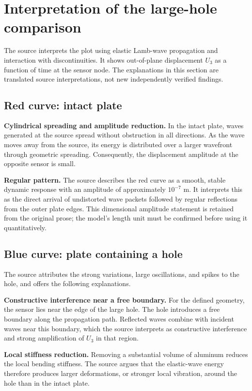 \documentclass[11pt,a4paper]{article}
\begin{document}
\section{Interpretation of the large-hole comparison}
The source interprets the plot using elastic Lamb-wave propagation and interaction with discontinuities. It shows out-of-plane displacement $U_3$ as a function of time at the sensor node. The explanations in this section are translated source interpretations, not new independently verified findings.
\subsection{Red curve: intact plate}
\textbf{Cylindrical spreading and amplitude reduction.} In the intact plate, waves generated at the source spread without obstruction in all directions. As the wave moves away from the source, its energy is distributed over a larger wavefront through geometric spreading. Consequently, the displacement amplitude at the opposite sensor is small.

\textbf{Regular pattern.} The source describes the red curve as a smooth, stable dynamic response with an amplitude of approximately $10^{-7}$ m. It interprets this as the direct arrival of undistorted wave packets followed by regular reflections from the outer plate edges. This dimensional amplitude statement is retained from the original prose; the model's length unit must be confirmed before using it quantitatively.
\subsection{Blue curve: plate containing a hole}
The source attributes the strong variations, large oscillations, and spikes to the hole, and offers the following explanations.

\textbf{Constructive interference near a free boundary.} For the defined geometry, the sensor lies near the edge of the large hole. The hole introduces a free boundary along the propagation path. Reflected waves combine with incident waves near this boundary, which the source interprets as constructive interference and strong amplification of $U_3$ in that region.

\textbf{Local stiffness reduction.} Removing a substantial volume of aluminum reduces the local bending stiffness. The source argues that the elastic-wave energy therefore produces larger deformations, or stronger local vibration, around the hole than in the intact plate.
\end{document}
